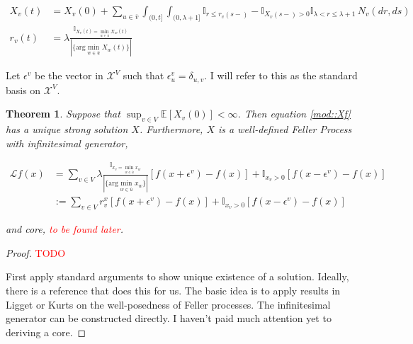 \documentclass[12pt]{article}
\newcommand{\mb}{\mathbb}
\newcommand{\mc}{\mathcal}
\newcommand{\ov}{\overline}
\newcommand{\te}{\text}
\newcommand{\ep}{\epsilon}
\newcommand{\tr}{\textcolor{red}}
\newcommand{\ex}[1]{\mb{E}\left[#1\right]}			%
\newcommand{\argmin}{\te{arg}\min}
\newcommand{\Xf}{X}									%
\newcommand{\vcomp}[1]{_{#1}}						%
\newcommand{\tme}[1]{(#1)}							%
\newcommand{\stte}{\mc{X}}							%
\newcommand{\arr}{\lambda}							%
\newcommand{\poiss}{N}								%
\newcommand{\poissv}[1]{_{#1}}						%
\newcommand{\cl}[1]{\ov{#1}}
\newcommand{\IG}{\mc{L}}
\newcommand{\ev}[1]{\ep^{#1}}
\newcommand{\para}[1]{^{#1}}
\newtheorem{thms}{Theorem}[section]
\begin{document}
\begin{align}
\Xf\vcomp{v}\tme{t} &= \Xf\vcomp{v}\tme{0} + \sum_{u \in \cl{v}} \int_{(0,t]}\int_{(0,\arr + 1]} \mb{I}_{r \leq r\vcomp{v}\tme{s-}} - \mb{I}_{\Xf\vcomp{v}\tme{s-} > 0}\mb{I}_{\arr < r \leq \arr+1}\,\poiss\poissv{v}(dr,ds)\label{mod::Xf}\\
r\vcomp{v}\tme{t} &= \arr\frac{\mb{I}_{\Xf\vcomp{v}\tme{t} = \min_{w \in \cl{u}} \Xf\vcomp{w}\tme{t}}}{|\{\argmin_{w \in \cl{u}} \Xf\vcomp{w}\tme{t}\}|}\nonumber
\end{align}

Let \(\ev{v}\) be the vector in \(\stte^V\) such that \(\ev{v}\vcomp{u} = \delta_{u,v}\). I will refer to this as the standard basis on \(\stte^V\).

\begin{thms}
Suppose that \(\sup_{v \in V} \ex{\Xf\vcomp{v}\tme{0}} < \infty\). Then equation \eqref{mod::Xf} has a unique strong solution \(\Xf\). Furthermore, \(\Xf\) is a well-defined Feller Process with infinitesimal generator,

\begin{align}
\IG f(x) &= \sum_{v \in V}\arr\frac{\mb{I}_{x\vcomp{v} = \min_{w \in \cl{u}} x\vcomp{w}}}{|\{\argmin_{w \in \cl{u}} x\vcomp{w}\}|}[f(x + \ev{v}) - f(x)] + \mb{I}_{x\vcomp{v} > 0}[f(x-\ev{v}) - f(x)]\nonumber\\
&:= \sum_{v \in V}r\vcomp{v}\para{x}[f(x + \ev{v}) - f(x)] + \mb{I}_{x\vcomp{v} > 0}[f(x-\ev{v}) - f(x)]\label{mod::IG}
\end{align}

and core, \tr{to be found later}.
\label{mod::Feller}
\end{thms}
\begin{proof}
\tr{TODO}

First apply standard arguments to show unique existence of a solution. Ideally, there is a reference that does this for us. The basic idea is to apply results in Ligget or Kurts on the well-posedness of Feller processes. The infinitesimal generator can be constructed directly. I haven't paid much attention yet to deriving a core.
\end{proof}
\end{document}
